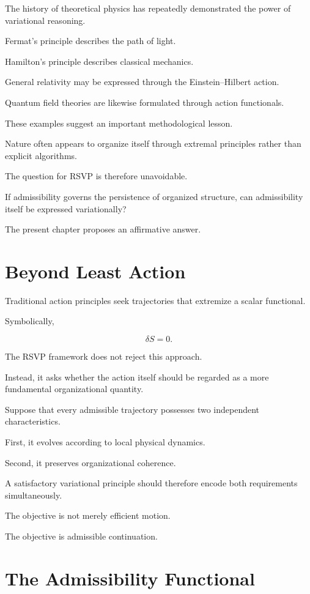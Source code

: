 \documentclass[11pt,oneside]{book}
\numberwithin{equation}{chapter}
\theoremstyle{definition}
\theoremstyle{plain}
\begin{document}
The history of theoretical physics has repeatedly demonstrated the power of
variational reasoning.

Fermat's principle describes the path of light.

Hamilton's principle describes classical mechanics.

General relativity may be expressed through the Einstein--Hilbert action.

Quantum field theories are likewise formulated through action functionals.

These examples suggest an important methodological lesson.

Nature often appears to organize itself through extremal principles rather
than explicit algorithms.

The question for RSVP is therefore unavoidable.

If admissibility governs the persistence of organized structure, can
admissibility itself be expressed variationally?

The present chapter proposes an affirmative answer.

\section{Beyond Least Action}

Traditional action principles seek trajectories that extremize a scalar
functional.

Symbolically,

\[
\delta S = 0.
\]

The RSVP framework does not reject this approach.

Instead, it asks whether the action itself should be regarded as a more
fundamental organizational quantity.

Suppose that every admissible trajectory possesses two independent
characteristics.

First, it evolves according to local physical dynamics.

Second, it preserves organizational coherence.

A satisfactory variational principle should therefore encode both
requirements simultaneously.

The objective is not merely efficient motion.

The objective is admissible continuation.

\section{The Admissibility Functional}
\end{document}

